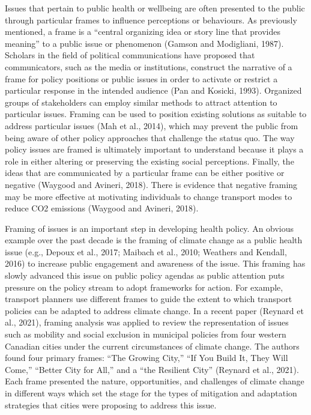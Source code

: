 \documentclass[]{elsarticle} %
\begin{document}
Issues that pertain to public health or wellbeing are often presented to
the public through particular frames to influence perceptions or
behaviours. As previously mentioned, a frame is a ``central organizing
idea or story line that provides meaning'' to a public issue or
phenomenon (Gamson and Modigliani, 1987). Scholars in the field of
political communications have proposed that communicators, such as the
media or institutions, construct the narrative of a frame for policy
positions or public issues in order to activate or restrict a particular
response in the intended audience (Pan and Kosicki, 1993). Organized
groups of stakeholders can employ similar methods to attract attention
to particular issues. Framing can be used to position existing solutions
as suitable to address particular issues (Mah et al., 2014), which may
prevent the public from being aware of other policy approaches that
challenge the status quo. The way policy issues are framed is ultimately
important to understand because it plays a role in either altering or
preserving the existing social perceptions. Finally, the ideas that are
communicated by a particular frame can be either positive or negative
(Waygood and Avineri, 2018). There is evidence that negative framing may
be more effective at motivating individuals to change transport modes to
reduce CO2 emissions (Waygood and Avineri, 2018).

Framing of issues is an important step in developing health policy. An
obvious example over the past decade is the framing of climate change as
a public health issue (e.g., Depoux et al., 2017; Maibach et al., 2010;
Weathers and Kendall, 2016) to increase public engagement and awareness
of the issue. This framing has slowly advanced this issue on public
policy agendas as public attention puts pressure on the policy stream to
adopt frameworks for action. For example, transport planners use
different frames to guide the extent to which transport policies can be
adapted to address climate change. In a recent paper (Reynard et al.,
2021), framing analysis was applied to review the representation of
issues such as mobility and social exclusion in municipal policies from
four western Canadian cities under the current circumstances of climate
change. The authors found four primary frames: ``The Growing City,''
``If You Build It, They Will Come,'' ``Better City for All,'' and a
``the Resilient City'' (Reynard et al., 2021). Each frame presented the
nature, opportunities, and challenges of climate change in different
ways which set the stage for the types of mitigation and adaptation
strategies that cities were proposing to address this issue.
\end{document}

